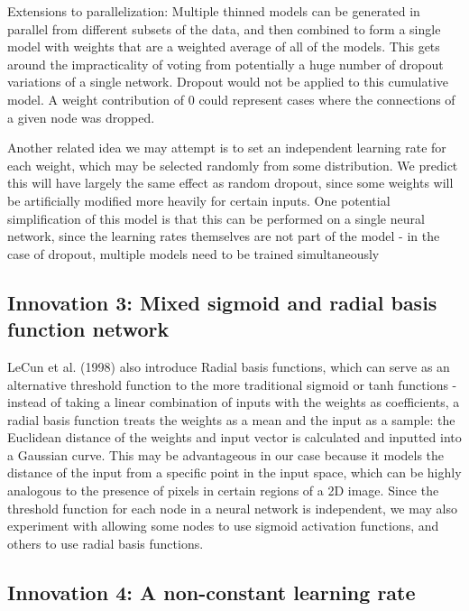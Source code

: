 \documentclass[12pt]{article}  %
\begin{document}
Extensions to parallelization: Multiple thinned models can be generated in parallel from different subsets of the data, and then combined to form a single model with weights that are a weighted average of all of the models. This gets around the impracticality of voting from potentially a huge number of dropout variations of a single network. Dropout would not be applied to this cumulative model. A weight contribution of 0 could represent cases where the connections of a given node was dropped.

Another related idea we may attempt is to set an independent learning rate for each weight, which may be selected randomly from some distribution. We predict this will have largely the same effect as random dropout, since some weights will be artificially modified more heavily for certain inputs. One potential simplification of this model is that this can be performed on a single neural network, since the learning rates themselves are not part of the model - in the case of dropout, multiple models need to be trained simultaneously

\subsection{ Innovation 3: Mixed sigmoid and radial basis function network}
\label{ Innovation 3: Mixed sigmoid and radial basis function network}
LeCun et al. (1998) also introduce Radial basis functions, which can serve as an alternative threshold function to the more traditional sigmoid or tanh functions - instead of taking a linear combination of inputs with the weights as coefficients, a radial basis function treats the weights as a mean and the input as a sample: the Euclidean distance of the weights and input vector is calculated and inputted into a Gaussian curve. This may be advantageous in our case because it models the distance of the input from a specific point in the input space, which can be highly analogous to the presence of pixels in certain regions of a 2D image. Since the threshold function for each node in a neural network is independent, we may also experiment with allowing some nodes to use sigmoid activation functions, and others to use radial basis functions.

\subsection{Innovation 4: A non-constant learning rate}
\label{Innovation 4: A non-constant learning rate}
\end{document}
